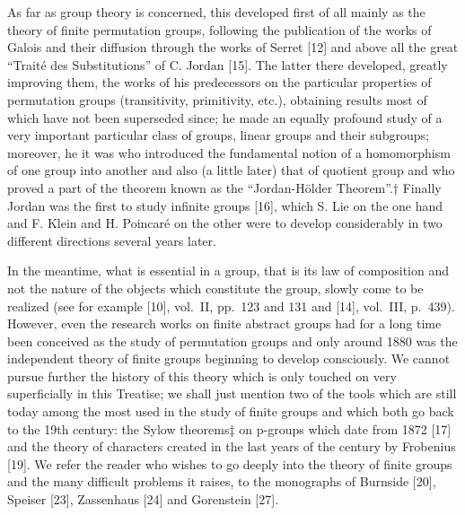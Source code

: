 As far as group theory is concerned, this developed first of all mainly as the theory of finite permutation groups, following the publication of the works of Galois and their diffusion through the works of Serret {[}12{]} and above all the great ``Traité des Substitutions'' of C. Jordan {[}15{]}. The latter there developed, greatly improving them, the works of his predecessors on the particular properties of permutation groups (transitivity, primitivity, etc.), obtaining results most of which have not been superseded since; he made an equally profound study of a very important particular class of groups, linear groups and their subgroups; moreover, he it was who introduced the fundamental notion of a homomorphism of one group into another and also (a little later) that of quotient group and who proved a part of the theorem known as the ``Jordan-Hölder Theorem''.† Finally Jordan was the first to study infinite groups {[}16{]}, which S. Lie on the one hand and F. Klein and H. Poincaré on the other were to develop considerably in two different directions several years later.

In the meantime, what is essential in a group, that is its law of composition and not the nature of the objects which constitute the group, slowly come to be realized (see for example {[}10{]}, vol.~II, pp.~123 and 131 and {[}14{]}, vol.~III, p.~439). However, even the research works on finite abstract groups had for a long time been conceived as the study of permutation groups and only around 1880 was the independent theory of finite groups beginning to develop consciously. We cannot pursue further the history of this theory which is only touched on very superficially in this Treatise; we shall just mention two of the tools which are still today among the most used in the study of finite groups and which both go back to the 19th century: the Sylow theorems‡ on p-groups which date from 1872 {[}17{]} and the theory of characters created in the last years of the century by Frobenius {[}19{]}. We refer the reader who wishes to go deeply into the theory of finite groups and the many difficult problems it raises, to the monographs of Burnside {[}20{]}, Speiser {[}23{]}, Zassenhaus {[}24{]} and Gorenstein {[}27{]}.


